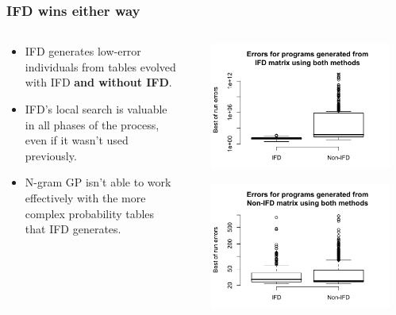 \documentclass{beamer}
\newcommand{\linespace}{\vskip 0.25cm}
\begin{document}
\begin{frame}
\frametitle{IFD wins either way}

\begin{columns}
\begin{column}{0.6\textwidth}

\begin{itemize}
	\item IFD generates low-error individuals from tables evolved with IFD \textbf{and without IFD}.
	\linespace
	\item IFD's local search is valuable in all phases of the process, even if it wasn't used previously.
	\linespace
	\item N-gram GP isn't able to work effectively with the more complex probability tables that IFD generates.
\end{itemize}
\end{column}

\begin{column}{0.02\textwidth}
\end{column}

\begin{column}{0.5\textwidth}

\includegraphics[width=0.915\textwidth]{ErrorsGenedProgsFromIfdMatrix.pdf}

\includegraphics[width=0.915\textwidth]{ErrorsGenedProgsFromNonIfdMatrix.pdf}

\end{column}
\end{columns}

\end{frame}
\end{document}
